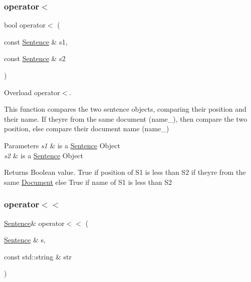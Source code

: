 \subsubsection{\texorpdfstring{operator$<$}{operator<}}
{\footnotesize\ttfamily bool operator$<$ (\begin{DoxyParamCaption}\item[{const \hyperlink{class_sentence}{Sentence} \&}]{s1,  }\item[{const \hyperlink{class_sentence}{Sentence} \&}]{s2 }\end{DoxyParamCaption})\hspace{0.3cm}{\ttfamily [friend]}}



Overload operator$<$. 

This function compares the two sentence objects, comparing their position and their name. If they\textquotesingle{}re from the same document (name\+\_\+), then compare the two position, else compare their document name (name\+\_\+)


\begin{DoxyParams}{Parameters}
{\em s1} & is a \hyperlink{class_sentence}{Sentence} Object \\
\hline
{\em s2} & is a \hyperlink{class_sentence}{Sentence} Object \\
\hline
\end{DoxyParams}
\begin{DoxyReturn}{Returns}
Boolean value. True if position of S1 is less than S2 if they\textquotesingle{}re from the same \hyperlink{class_document}{Document} else True if name of S1 is less than S2 
\end{DoxyReturn}
\mbox{\label{class_sentence_a6ef9e41c0c425b100ed7a95f482d2099}} 
\subsubsection{\texorpdfstring{operator$<$$<$}{operator<<}\hspace{0.1cm}{\footnotesize\ttfamily [1/2]}}
{\footnotesize\ttfamily \hyperlink{class_sentence}{Sentence}\& operator$<$$<$ (\begin{DoxyParamCaption}\item[{\hyperlink{class_sentence}{Sentence} \&}]{s,  }\item[{const std\+::string \&}]{str }\end{DoxyParamCaption})\hspace{0.3cm}{\ttfamily [friend]}}



